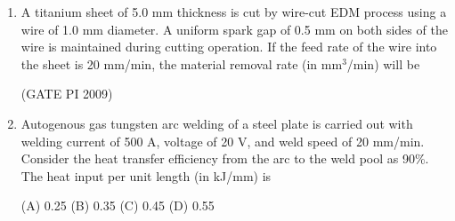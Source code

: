 \documentclass[journal,12pt,onecolumn]{IEEEtran}
\theoremstyle{remark}
\begin{document}
\begin{enumerate}[label=Q.\arabic*]
\begin{enumerate}[label=(\Alph*)]
\begin{multicols}{2}
\end{multicols}
\end{enumerate}
\hfill (GATE PI 2009)
\item A titanium sheet of 5.0 mm thickness is cut by wire-cut EDM process using a wire of 1.0 mm diameter. A uniform spark gap of 0.5 mm on both sides of the wire is maintained during cutting operation. If the feed rate of the wire into the sheet is 20 mm/min, the material removal rate (in mm$^3$/min) will be
\begin{enumerate}[label=(\Alph*)]
\end{enumerate}
\hfill (GATE PI 2009)
\item Autogenous gas tungsten arc welding of a steel plate is carried out with welding current of 500 A, voltage of 20 V, and weld speed of 20 mm/min. Consider the heat transfer efficiency from the arc to the weld pool as 90\%. The heat input per unit length (in kJ/mm) is

(A) 0.25 \hfill (B) 0.35 \hfill(C) 0.45 \hfill (D) 0.55 \\


\end{enumerate}
\end{document}
